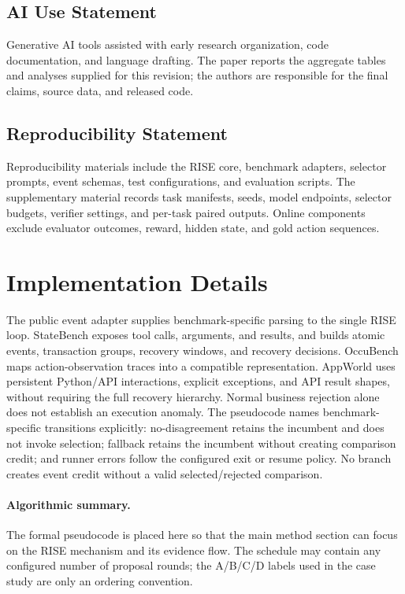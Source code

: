 \documentclass{article}
\begin{document}
\FloatBarrier
\subsection*{AI Use Statement}
Generative AI tools assisted with early research organization, code documentation, and language drafting. The paper reports the aggregate tables and analyses supplied for this revision; the authors are responsible for the final claims, source data, and released code.

\subsection*{Reproducibility Statement}
Reproducibility materials include the RISE core, benchmark adapters, selector prompts, event schemas, test configurations, and evaluation scripts. The supplementary material records task manifests, seeds, model endpoints, selector budgets, verifier settings, and per-task paired outputs. Online components exclude evaluator outcomes, reward, hidden state, and gold action sequences.




\appendix
\section{Implementation Details}
\label{app:implementation}
The public event adapter supplies benchmark-specific parsing to the single RISE loop. StateBench exposes tool calls, arguments, and results, and builds atomic events, transaction groups, recovery windows, and recovery decisions. OccuBench maps action-observation traces into a compatible representation. AppWorld uses persistent Python/API interactions, explicit exceptions, and API result shapes, without requiring the full recovery hierarchy. Normal business rejection alone does not establish an execution anomaly. The pseudocode names benchmark-specific transitions explicitly: no-disagreement retains the incumbent and does not invoke selection; fallback retains the incumbent without creating comparison credit; and runner errors follow the configured exit or resume policy. No branch creates event credit without a valid selected/rejected comparison.

\paragraph{Algorithmic summary.} The formal pseudocode is placed here so that the main method section can focus on the RISE mechanism and its evidence flow. The schedule may contain any configured number of proposal rounds; the A/B/C/D labels used in the case study are only an ordering convention.
\end{document}
